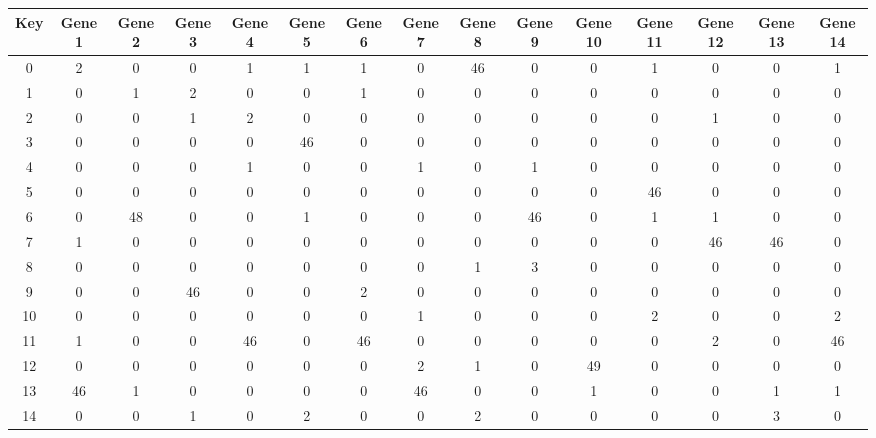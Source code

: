 \begin{tabular}{|c|c|c|c|c|c|c|c|c|c|c|c|c|c|c|}
\hline
Key & Gene 1 & Gene 2 & Gene 3 & Gene 4 & Gene 5 & Gene 6 & Gene 7 & Gene 8 & Gene 9 & Gene 10 & Gene 11 & Gene 12 & Gene 13 & Gene 14 \\
\hline
0 & 2 & 0 & 0 & 1 & 1 & 1 & 0 & 46 & 0 & 0 & 1 & 0 & 0 & 1 \\
1 & 0 & 1 & 2 & 0 & 0 & 1 & 0 & 0 & 0 & 0 & 0 & 0 & 0 & 0 \\
2 & 0 & 0 & 1 & 2 & 0 & 0 & 0 & 0 & 0 & 0 & 0 & 1 & 0 & 0 \\
3 & 0 & 0 & 0 & 0 & 46 & 0 & 0 & 0 & 0 & 0 & 0 & 0 & 0 & 0 \\
4 & 0 & 0 & 0 & 1 & 0 & 0 & 1 & 0 & 1 & 0 & 0 & 0 & 0 & 0 \\
5 & 0 & 0 & 0 & 0 & 0 & 0 & 0 & 0 & 0 & 0 & 46 & 0 & 0 & 0 \\
6 & 0 & 48 & 0 & 0 & 1 & 0 & 0 & 0 & 46 & 0 & 1 & 1 & 0 & 0 \\
7 & 1 & 0 & 0 & 0 & 0 & 0 & 0 & 0 & 0 & 0 & 0 & 46 & 46 & 0 \\
8 & 0 & 0 & 0 & 0 & 0 & 0 & 0 & 1 & 3 & 0 & 0 & 0 & 0 & 0 \\
9 & 0 & 0 & 46 & 0 & 0 & 2 & 0 & 0 & 0 & 0 & 0 & 0 & 0 & 0 \\
10 & 0 & 0 & 0 & 0 & 0 & 0 & 1 & 0 & 0 & 0 & 2 & 0 & 0 & 2 \\
11 & 1 & 0 & 0 & 46 & 0 & 46 & 0 & 0 & 0 & 0 & 0 & 2 & 0 & 46 \\
12 & 0 & 0 & 0 & 0 & 0 & 0 & 2 & 1 & 0 & 49 & 0 & 0 & 0 & 0 \\
13 & 46 & 1 & 0 & 0 & 0 & 0 & 46 & 0 & 0 & 1 & 0 & 0 & 1 & 1 \\
14 & 0 & 0 & 1 & 0 & 2 & 0 & 0 & 2 & 0 & 0 & 0 & 0 & 3 & 0 \\
\hline
\end{tabular}